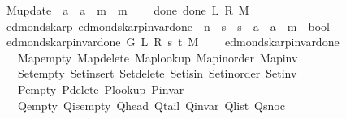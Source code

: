 \begin{isabellebody}
\ \ M{\isacharunderscore}{\kern0pt}update\ {\isacharcolon}{\kern0pt}{\isacharcolon}{\kern0pt}\ {\isachardoublequoteopen}{\isacharprime}{\kern0pt}a\ {\isasymRightarrow}\ {\isacharprime}{\kern0pt}a\ {\isasymRightarrow}\ {\isacharprime}{\kern0pt}m\ {\isasymRightarrow}\ {\isacharprime}{\kern0pt}m{\isachardoublequoteclose}\ {\isacharplus}{\kern0pt}\isanewline
\ \ \ done{\isacharunderscore}{\kern0pt}{}{\isacharcolon}{\kern0pt}\ {\isachardoublequoteopen}done{\isacharunderscore}{\kern0pt}{}\ L\ R\ M{\isachardoublequoteclose}\isanewline
%
\isadeliminvisible
\isanewline
%
\endisadeliminvisible
%
\isataginvisible
{}\isamarkupfalse%
\ {\isacharparenleft}{\kern0pt}\ edmonds{\isacharunderscore}{\kern0pt}karp{\isacharparenright}{\kern0pt}\ edmonds{\isacharunderscore}{\kern0pt}karp{\isacharunderscore}{\kern0pt}invar{\isacharunderscore}{\kern0pt}done{\isacharunderscore}{\kern0pt}{}{\isacharprime}{\kern0pt}\ {\isacharcolon}{\kern0pt}{\isacharcolon}{\kern0pt}\ {\isachardoublequoteopen}{\isacharprime}{\kern0pt}n\ {\isasymRightarrow}\ {\isacharprime}{\kern0pt}s\ {\isasymRightarrow}\ {\isacharprime}{\kern0pt}s\ {\isasymRightarrow}\ {\isacharprime}{\kern0pt}a\ {\isasymRightarrow}\ {\isacharprime}{\kern0pt}a\ {\isasymRightarrow}\ {\isacharprime}{\kern0pt}m\ {\isasymRightarrow}\ bool{\isachardoublequoteclose}\ \isanewline
\ \ {\isachardoublequoteopen}edmonds{\isacharunderscore}{\kern0pt}karp{\isacharunderscore}{\kern0pt}invar{\isacharunderscore}{\kern0pt}done{\isacharunderscore}{\kern0pt}{}{\isacharprime}{\kern0pt}\ G\ L\ R\ s\ t\ M\ {\isasymequiv}\isanewline
\ \ \ edmonds{\isacharunderscore}{\kern0pt}karp{\isacharunderscore}{\kern0pt}invar{\isacharunderscore}{\kern0pt}done{\isacharunderscore}{\kern0pt}{}\isanewline
\ \ \ \ Map{\isacharunderscore}{\kern0pt}empty\ Map{\isacharunderscore}{\kern0pt}delete\ Map{\isacharunderscore}{\kern0pt}lookup\ Map{\isacharunderscore}{\kern0pt}inorder\ Map{\isacharunderscore}{\kern0pt}inv\isanewline
\ \ \ \ Set{\isacharunderscore}{\kern0pt}empty\ Set{\isacharunderscore}{\kern0pt}insert\ Set{\isacharunderscore}{\kern0pt}delete\ Set{\isacharunderscore}{\kern0pt}isin\ Set{\isacharunderscore}{\kern0pt}inorder\ Set{\isacharunderscore}{\kern0pt}inv\isanewline
\ \ \ \ P{\isacharunderscore}{\kern0pt}empty\ P{\isacharunderscore}{\kern0pt}delete\ P{\isacharunderscore}{\kern0pt}lookup\ P{\isacharunderscore}{\kern0pt}invar\isanewline
\ \ \ \ Q{\isacharunderscore}{\kern0pt}empty\ Q{\isacharunderscore}{\kern0pt}is{\isacharunderscore}{\kern0pt}empty\ Q{\isacharunderscore}{\kern0pt}head\ Q{\isacharunderscore}{\kern0pt}tail\ Q{\isacharunderscore}{\kern0pt}invar\ Q{\isacharunderscore}{\kern0pt}list\ Q{\isacharunderscore}{\kern0pt}snoc\isanewline

\end{isabellebody}
